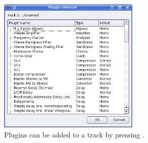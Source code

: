 \begin{figure}[t]
 \centering\includegraphics[width=0.6\textwidth]{../images/plugin-list}
 \caption{Plugins can be added to a track by pressing .}
 \label{fig_pluglist}
\end{figure}


